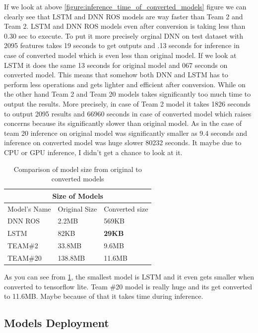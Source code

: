 If we look at above \ref{figure:inference_time_of_converted_models} figure we can clearly see that LSTM and DNN ROS models are way faster than Team 2 and Team 2. LSTM and DNN ROS models even after conversion is taking less than 0.30 sec to execute. To put it more precisely orginal DNN on test dataset with 2095 features takes 19 seconds to get outputs and .13 seconds for inference in case of converted model which is even less than original model. If we look at LSTM it does the same 13 seconds for original model and 067 seconds on converted model. This means that somehow both DNN and LSTM has to perform less operations and gets lighter and efficient after conversion. While on the other hand Team 2 and Team 20 models takes significantly too much time to output the results. More precisely, in case of Team 2 model it takes 1826 seconds to output 2095 results and 66960 seconds in case of converted model which raises concerns because its significantly slower than original model. As in the case of team 20 inference on original model was significantly smaller as 9.4 seconds and inference on converted model was huge slower 80232 seconds. It maybe due to CPU or GPU inference, I didn't get a chance to look at it. 

\begin{table}
\centering
\begin{tabular}{ |p{5cm}||p{3cm}|p{3cm}|}
 \hline
 \multicolumn{3}{|c|}{Size of Models} \\
 \hline
 Model's Name& Original Size&Converted size\\
 \hline
 DNN ROS   & 2.2MB   &   569KB\\
 LSTM&  82KB   & \textbf{29KB} \\
 TEAM\#2 &33.8MB & 9.6MB\\
 TEAM\#20  & 138.8MB & 11.6MB\\
 \hline
\end{tabular}
 \caption{\label{tab:models_size_after_conversion}Comparison of model size from original to converted models}
 \end{table}
 
 As you can see from \ref{tab:models_size_after_conversion}, the smallest model is LSTM and it even gets smaller when converted to tensorflow lite. Team \#20 model is really huge and its get converted to 11.6MB. Maybe because of that it takes time during inference. 
 
\subsection{Models Deployment}

